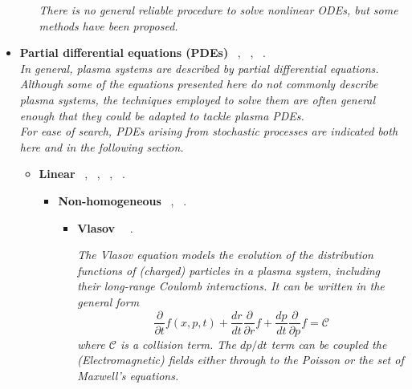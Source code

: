 \documentclass[12pt,letterpaper]{article}
\begin{document}
\begin{itemize}
\begin{itemize}
            \textit{There is no general reliable procedure to solve nonlinear ODEs, but some methods have been proposed.}
		\end{itemize}
  
	\item \textbf{Partial differential equations (PDEs)} ~\cite{garcia-molinaQuantumFourierAnalysis2022},  ~\cite{childsHighprecisionQuantumAlgorithms2021,kroviImprovedQuantumAlgorithms2022}, ~\cite{garcia-ripollQuantuminspiredAlgorithmsMultivariate2021}.
    \\\emph{In general, plasma systems are described by partial differential equations. Although some of the equations presented here do not commonly describe plasma systems, the techniques employed to solve them are often general enough that they could be adapted to tackle plasma PDEs.\\
    For ease of search, PDEs arising from stochastic processes are indicated both here and in the following section.}
		\begin{itemize} 
			\item \textbf{Linear} ~\cite{omalleyNeartermQuantumAlgorithm2022},  ~\cite{jinQuantumSimulationPartial2022}, ~\cite{jinQuantumSimulationPartial2022a},  ~\cite{criadoQadeSolvingDifferential2022}.
				\begin{itemize} 
					\item \textbf{Non-homogeneous}  ~\cite{bravo-prietoVariationalQuantumLinear2020},  ~\cite{arrazolaQuantumAlgorithmNonhomogeneous2019,ricardoAlternativesNonhomogeneousPartial2022}.
						\begin{itemize} 
                            \item \textbf{Vlasov} ~~\cite{engelQuantumAlgorithmVlasov2019}.

                            \textit{The Vlasov equation models the evolution of the distribution functions of (charged) particles in a plasma system, including their long-range Coulomb interactions. It can be written in the general form}
                            $$ \dfrac{\partial }{\partial t} f(x,p,t) + \dfrac{d r}{d t} \dfrac{\partial }{\partial r} f + \dfrac{d p}{d t} \dfrac{\partial }{\partial p} f = \mathcal{C}$$
                            \textit{where $\mathcal{C}$ is a collision term. The $dp/dt$ term can be coupled the (Electromagnetic) fields either through to the Poisson or the set of Maxwell's equations.}
                            

\end{itemize}
\end{itemize}
\end{itemize}
\end{itemize}
\end{document}
